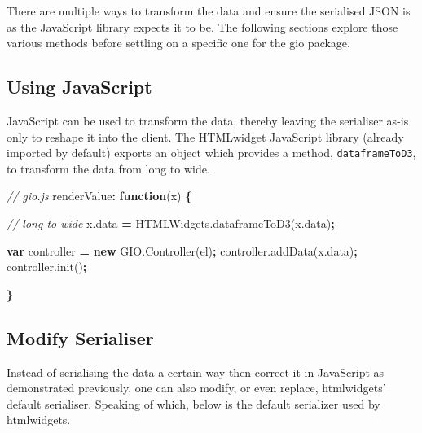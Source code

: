 \documentclass[
  10pt,
]{krantz}
\makeatletter
\newenvironment{Shaded}{\begin{snugshade}}{\end{snugshade}}
\newcommand{\AttributeTok}[1]{\textcolor[rgb]{0.61,0.61,0.61}{#1}}
\newcommand{\CommentTok}[1]{\textcolor[rgb]{0.37,0.37,0.37}{\textit{#1}}}
\newcommand{\KeywordTok}[1]{\textcolor[rgb]{0.27,0.27,0.27}{\textbf{#1}}}
\newcommand{\NormalTok}[1]{#1}
\newcommand{\OperatorTok}[1]{\textcolor[rgb]{0.43,0.43,0.43}{\textbf{#1}}}
\newcommand{\VariableTok}[1]{\textcolor[rgb]{0,0,0}{#1}}
\newenvironment{kframe}{%
\medskip{}
\setlength{\fboxsep}{.8em}
 \def\at@end@of@kframe{}%
 \ifinner\ifhmode%
  \def\at@end@of@kframe{\end{minipage}}%
  \begin{minipage}{\columnwidth}%
 \fi\fi%
 \def\FrameCommand##1{\hskip\@totalleftmargin \hskip-\fboxsep
 \colorbox{shadecolor}{##1}\hskip-\fboxsep
     \hskip-\linewidth \hskip-\@totalleftmargin \hskip\columnwidth}%
 \MakeFramed {\advance\hsize-\width
   \@totalleftmargin\z@ \linewidth\hsize
   \@setminipage}}%
 {\par\unskip\endMakeFramed%
 \at@end@of@kframe}
\renewenvironment{Shaded}{\begin{kframe}}{\end{kframe}}
\makeatother
\begin{document}
There are multiple ways to transform the data and ensure the serialised JSON is as the JavaScript library expects it to be. The following sections explore those various methods before settling on a specific one for the gio package.

\hypertarget{widgets-full-transform-data-js}{%
\subsection{Using JavaScript}\label{widgets-full-transform-data-js}}

JavaScript can be used to transform the data, thereby leaving the serialiser as-is only to reshape it into the client. The HTMLwidget JavaScript library (already imported by default) exports an object which provides a method, \texttt{dataframeToD3}, to transform the data from long to wide.

\begin{Shaded}
\begin{Highlighting}[]
\CommentTok{// gio.js}
\NormalTok{renderValue}\OperatorTok{:} \KeywordTok{function}\NormalTok{(x) }\OperatorTok{\{}

  \CommentTok{// long to wide}
  \VariableTok{x}\NormalTok{.}\AttributeTok{data} \OperatorTok{=} \VariableTok{HTMLWidgets}\NormalTok{.}\AttributeTok{dataframeToD3}\NormalTok{(}\VariableTok{x}\NormalTok{.}\AttributeTok{data}\NormalTok{)}\OperatorTok{;}

  \KeywordTok{var}\NormalTok{ controller }\OperatorTok{=} \KeywordTok{new} \VariableTok{GIO}\NormalTok{.}\AttributeTok{Controller}\NormalTok{(el)}\OperatorTok{;}
  \VariableTok{controller}\NormalTok{.}\AttributeTok{addData}\NormalTok{(}\VariableTok{x}\NormalTok{.}\AttributeTok{data}\NormalTok{)}\OperatorTok{;} 
  \VariableTok{controller}\NormalTok{.}\AttributeTok{init}\NormalTok{()}\OperatorTok{;}

\OperatorTok{\}}
\end{Highlighting}
\end{Shaded}

\hypertarget{widgets-full-transform-data-modify}{%
\subsection{Modify Serialiser}\label{widgets-full-transform-data-modify}}

Instead of serialising the data a certain way then correct it in JavaScript as demonstrated previously, one can also modify, or even replace, htmlwidgets' default serialiser. Speaking of which, below is the default serializer used by htmlwidgets.
\end{document}
